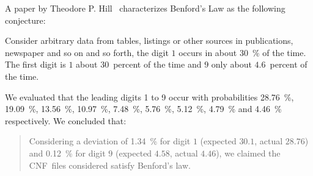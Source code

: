 A paper by Theodore P. Hill~\cite{hill1998first} characterizes Benford's Law
as the following conjecture:
\begin{theorem}
  Consider arbitrary data from tables, listings or other sources in publications, newspaper
  and so on and so forth, the digit $1$ occurs in about 30~\% of the time.
  The first digit is $1$ about $30$~percent of the time
  and $9$ only about $4.6$~percent of the time.
\end{theorem}
We evaluated that the leading digits 1 to 9 occur with probabilities
28.76~\%, 19.09~\%, 13.56~\%, 10.97~\%, 7.48~\%, 5.76~\%, 5.12~\%, 4.79~\%
and 4.46~\% respectively. We concluded that:
\begin{quote}
  Considering a deviation of 1.34~\% for digit $1$ (expected $30.1$, actual $28.76$) and
  0.12~\% for digit $9$ (expected $4.58$, actual $4.46$),
  we claimed the CNF~files considered satisfy Benford's law.
\end{quote}
